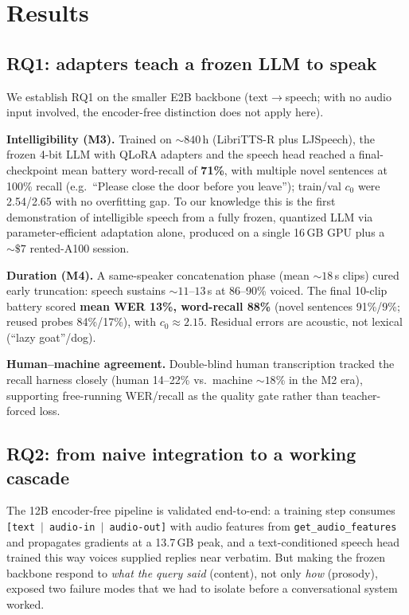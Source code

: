 \documentclass[11pt]{article}
\begin{document}
\section{Results}
\label{sec:results}
\subsection{RQ1: adapters teach a frozen LLM to speak}
\label{sec:rq2}
We establish RQ1 on the smaller E2B backbone (text$\to$speech; with no audio
input involved, the encoder-free distinction does not apply here).

\textbf{Intelligibility (M3).} Trained on ${\sim}840$\,h (LibriTTS-R plus
LJSpeech), the frozen 4-bit LLM with QLoRA adapters and the speech head reached a
final-checkpoint mean battery word-recall of \textbf{71\%}, with multiple novel
sentences at 100\% recall (e.g.\ ``Please close the door before you leave'');
train/val $c_0$ were 2.54/2.65 with no overfitting gap. To our knowledge this is
the first demonstration of intelligible speech from a fully frozen, quantized LLM
via parameter-efficient adaptation alone, produced on a single 16\,GB GPU plus a
${\sim}\$7$ rented-A100 session.

\textbf{Duration (M4).} A same-speaker concatenation phase (mean ${\sim}18$\,s
clips) cured early truncation: speech sustains ${\sim}11$--$13$\,s at 86--90\%
voiced. The final 10-clip battery scored \textbf{mean WER 13\%, word-recall 88\%}
(novel sentences 91\%/9\%; reused probes 84\%/17\%), with $c_0\approx2.15$.
Residual errors are acoustic, not lexical (``lazy goat''/dog).

\textbf{Human--machine agreement.} Double-blind human transcription tracked the
recall harness closely (human 14--22\% vs.\ machine ${\sim}18$\% in the M2 era),
supporting free-running WER/recall as the quality gate rather than teacher-forced
loss.

\subsection{RQ2: from naive integration to a working cascade}
\label{sec:rq1}
The 12B encoder-free pipeline is validated end-to-end: a training step consumes
\texttt{[text $\mid$ audio-in $\mid$ audio-out]} with audio features from
\texttt{get\_audio\_features} and propagates gradients at a 13.7\,GB peak, and a
text-conditioned speech head trained this way voices supplied replies near
verbatim. But making the frozen backbone respond to \emph{what the query said}
(content), not only \emph{how} (prosody), exposed two failure modes that we had to
isolate before a conversational system worked.
\end{document}
